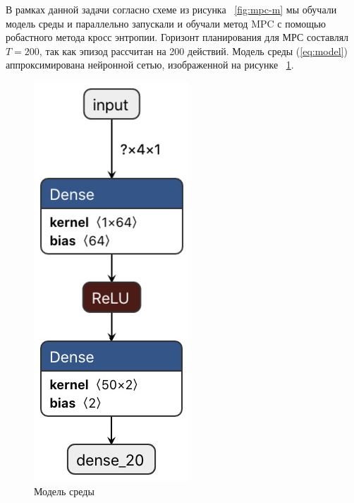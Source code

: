 В рамках данной задачи согласно схеме из рисунка ~\ref{fig:mpc-m} мы обучали модель среды и параллельно запускали и обучали метод MPC с помощью робастного метода кросс энтропии. Горизонт планирования для МРС  составлял $T=200$, так как эпизод рассчитан на 200 действий. Модель среды (\ref{eq:model}) аппроксимирована нейронной сетью, изображенной на рисунке ~\ref{fig:nn-new}. 
\begin{figure}[h]
	\centering
	\includegraphics[scale=0.8]{nn_new.jpeg}
	\caption {Модель среды}
	\label{fig:nn-new}
\end{figure}
\newpage

